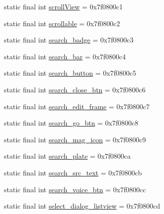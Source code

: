 \begin{DoxyCompactItemize}
\item 
static final int \mbox{\hyperlink{classandroid_1_1support_1_1design_1_1_r_1_1id_a2de3dd9900590ae7787cfd98c2902697}{scroll\+View}} = 0x7f0800c1
\item 
static final int \mbox{\hyperlink{classandroid_1_1support_1_1design_1_1_r_1_1id_a0a5991f478e0a41ee7785532f90a42c4}{scrollable}} = 0x7f0800c2
\item 
static final int \mbox{\hyperlink{classandroid_1_1support_1_1design_1_1_r_1_1id_ab0e2b2d083c20f23f39c4fe0349968c3}{search\+\_\+badge}} = 0x7f0800c3
\item 
static final int \mbox{\hyperlink{classandroid_1_1support_1_1design_1_1_r_1_1id_a0179560e777b05cd454e5ef1a4440d8a}{search\+\_\+bar}} = 0x7f0800c4
\item 
static final int \mbox{\hyperlink{classandroid_1_1support_1_1design_1_1_r_1_1id_ad73247be7f6a487b058f4d433c817d62}{search\+\_\+button}} = 0x7f0800c5
\item 
static final int \mbox{\hyperlink{classandroid_1_1support_1_1design_1_1_r_1_1id_a5e6590cb31c93c114ae749b14d1755d2}{search\+\_\+close\+\_\+btn}} = 0x7f0800c6
\item 
static final int \mbox{\hyperlink{classandroid_1_1support_1_1design_1_1_r_1_1id_ab4106953fa5afe73dbdda5b502b4b31f}{search\+\_\+edit\+\_\+frame}} = 0x7f0800c7
\item 
static final int \mbox{\hyperlink{classandroid_1_1support_1_1design_1_1_r_1_1id_afceae185876ccb35a694edeebe51c5a6}{search\+\_\+go\+\_\+btn}} = 0x7f0800c8
\item 
static final int \mbox{\hyperlink{classandroid_1_1support_1_1design_1_1_r_1_1id_a2aaecfd3a9dd6e4c3349e5f26561d0c7}{search\+\_\+mag\+\_\+icon}} = 0x7f0800c9
\item 
static final int \mbox{\hyperlink{classandroid_1_1support_1_1design_1_1_r_1_1id_a718e248d6d7959bcfb7577c8a169160f}{search\+\_\+plate}} = 0x7f0800ca
\item 
static final int \mbox{\hyperlink{classandroid_1_1support_1_1design_1_1_r_1_1id_a2359a86e57bfe8d942fd216893170d78}{search\+\_\+src\+\_\+text}} = 0x7f0800cb
\item 
static final int \mbox{\hyperlink{classandroid_1_1support_1_1design_1_1_r_1_1id_af93508c1f5a72931efe0477e848c207f}{search\+\_\+voice\+\_\+btn}} = 0x7f0800cc
\item 
static final int \mbox{\hyperlink{classandroid_1_1support_1_1design_1_1_r_1_1id_a8f804d5354b7fe1dbec4597297918e38}{select\+\_\+dialog\+\_\+listview}} = 0x7f0800cd
\item 

\end{DoxyCompactItemize}

